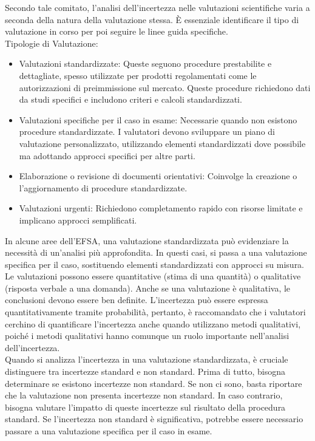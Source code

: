 Secondo tale comitato, l'analisi dell'incertezza nelle valutazioni scientifiche varia a seconda della natura della valutazione stessa. È essenziale identificare il tipo di valutazione in corso per poi seguire le linee guida specifiche.\\

\noindent Tipologie di Valutazione:
\begin{itemize}
    \item Valutazioni standardizzate: Queste seguono procedure prestabilite e dettagliate, spesso utilizzate per prodotti regolamentati come le autorizzazioni di preimmissione sul mercato. Queste procedure richiedono dati da studi specifici e includono criteri e calcoli standardizzati.
    \item  Valutazioni specifiche per il caso in esame: Necessarie quando non esistono procedure standardizzate. I valutatori devono sviluppare un piano di valutazione personalizzato, utilizzando elementi standardizzati dove possibile ma adottando approcci specifici per altre parti.
    \item  Elaborazione o revisione di documenti orientativi: Coinvolge la creazione o l'aggiornamento di procedure standardizzate.
    \item  Valutazioni urgenti: Richiedono completamento rapido con risorse limitate e implicano approcci semplificati.
    
\end{itemize}

In alcune aree dell'EFSA, una valutazione standardizzata può evidenziare la necessità di un'analisi più approfondita. In questi casi, si passa a una valutazione specifica per il caso, sostituendo elementi standardizzati con approcci su misura.\\
Le valutazioni possono essere quantitative (stima di una quantità) o qualitative (risposta verbale a una domanda). Anche se una valutazione è qualitativa, le conclusioni devono essere ben definite. L'incertezza può essere espressa quantitativamente tramite probabilità, pertanto, è raccomandato che i valutatori cerchino di quantificare l'incertezza anche quando utilizzano metodi qualitativi, poiché i metodi qualitativi hanno comunque un ruolo importante nell'analisi dell'incertezza.\\

Quando si analizza l'incertezza in una valutazione standardizzata, è cruciale distinguere tra incertezze standard e non standard. Prima di tutto, bisogna determinare se esistono incertezze non standard. Se non ci sono, basta riportare che la valutazione non presenta incertezze non standard. In caso contrario, bisogna valutare l'impatto di queste incertezze sul risultato della procedura standard. Se l'incertezza non standard è significativa, potrebbe essere necessario passare a una valutazione specifica per il caso in esame.\\

